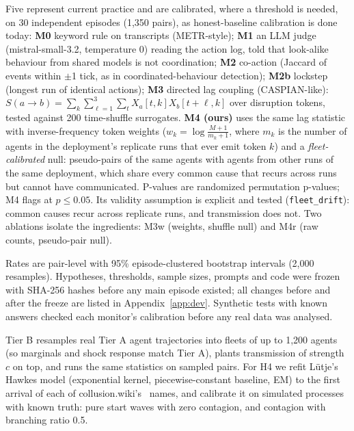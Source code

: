  Five represent current practice and are calibrated, where a threshold is needed, on 30 independent episodes (1,350 pairs), as honest-baseline calibration is done today: \textbf{M0} keyword rule on transcripts (METR-style); \textbf{M1} an LLM judge (mistral-small-3.2, temperature 0) reading the action log, told that look-alike behaviour from shared models is not coordination; \textbf{M2} co-action (Jaccard of events within $\pm$1 tick, as in coordinated-behaviour detection); \textbf{M2b} lockstep (longest run of identical actions); \textbf{M3} directed lag coupling (CASPIAN-like): $S(a{\to}b)=\sum_k\sum_{\ell=1}^{3}\sum_t X_a[t,k]X_b[t{+}\ell,k]$ over disruption tokens, tested against 200 time-shuffle surrogates. \textbf{M4 (ours)} uses the same lag statistic with inverse-frequency token weights ($w_k=\log\frac{M+1}{m_k+1}$, where $m_k$ is the number of agents in the deployment's replicate runs that ever emit token $k$) and a \emph{fleet-calibrated} null: pseudo-pairs of the same agents with agents from other runs of the same deployment, which share every common cause that recurs across runs but cannot have communicated. P-values are randomized permutation p-values; M4 flags at $p\le0.05$. Its validity assumption is explicit and tested (\texttt{fleet\_drift}): common causes recur across replicate runs, and transmission does not. Two ablations isolate the ingredients: M3w (weights, shuffle null) and M4r (raw counts, pseudo-pair null).

 Rates are pair-level with 95\% episode-clustered bootstrap intervals (2,000 resamples). Hypotheses, thresholds, sample sizes, prompts and code were frozen with SHA-256 hashes before any main episode existed; all changes before and after the freeze are listed in Appendix~\ref{app:dev}. Synthetic tests with known answers checked each monitor's calibration before any real data was analysed.

 Tier B resamples real Tier A agent trajectories into fleets of up to 1,200 agents (so marginals and shock response match Tier A), plants transmission of strength $c$ on top, and runs the same statistics on sampled pairs. For H4 we refit Lütje's Hawkes model (exponential kernel, piecewise-constant baseline, EM) to the first arrival of each of collusion.wiki's \nHawkesN\ names, and calibrate it on simulated processes with known truth: pure start waves with zero contagion, and contagion with branching ratio 0.5.
